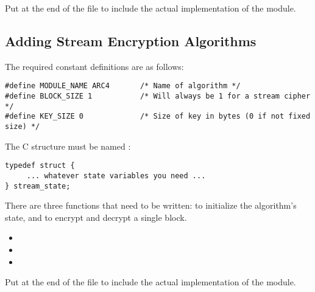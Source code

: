 \documentclass{howto}
\begin{document}
Put  at the end of the file to
include the actual implementation of the module.


\subsection{Adding Stream Encryption Algorithms}

The required constant definitions are as follows:

\begin{verbatim}
#define MODULE_NAME ARC4       /* Name of algorithm */
#define BLOCK_SIZE 1           /* Will always be 1 for a stream cipher */
#define KEY_SIZE 0             /* Size of key in bytes (0 if not fixed size) */
\end{verbatim}

The C structure must be named :

\begin{verbatim}
typedef struct {
     ... whatever state variables you need ...
} stream_state;
\end{verbatim}

There are three functions that need to be written: to initialize the
algorithm's state, and to encrypt and decrypt a single block.

\begin{itemize}
  \item {}
  \item {}
  \item {}
\end{itemize}

Put  at the end of the file to
include the actual implementation of the module.
\end{document}
